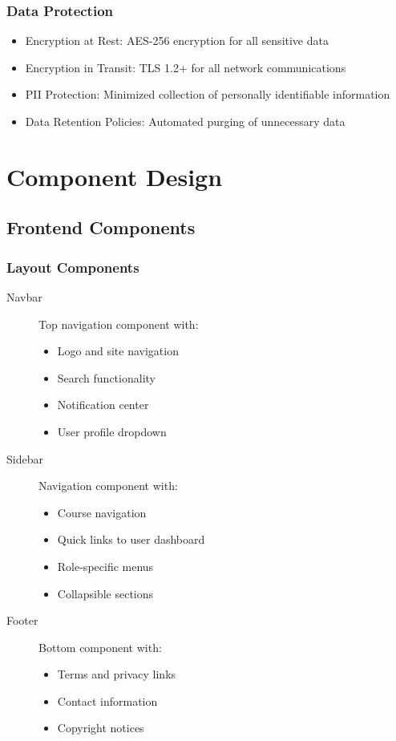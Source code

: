 \documentclass[a4paper, 11pt]{scrreprt}
\begin{document}
\subsection{Data Protection}
\begin{itemize}
    \item Encryption at Rest: AES-256 encryption for all sensitive data
    \item Encryption in Transit: TLS 1.2+ for all network communications
    \item PII Protection: Minimized collection of personally identifiable information
    \item Data Retention Policies: Automated purging of unnecessary data
\end{itemize}

\chapter{Component Design}

\section{Frontend Components}

\subsection{Layout Components}
\begin{description}
    \item[Navbar] Top navigation component with:
    \begin{itemize}
        \item Logo and site navigation
        \item Search functionality
        \item Notification center
        \item User profile dropdown
    \end{itemize}
    
    \item[Sidebar] Navigation component with:
    \begin{itemize}
        \item Course navigation
        \item Quick links to user dashboard
        \item Role-specific menus
        \item Collapsible sections
    \end{itemize}
    
    \item[Footer] Bottom component with:
    \begin{itemize}
        \item Terms and privacy links
        \item Contact information
        \item Copyright notices
    \end{itemize}
\end{description}
\end{document}
